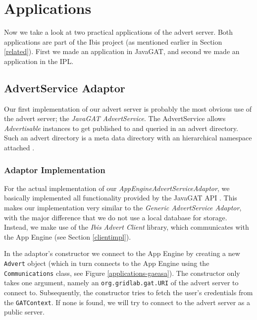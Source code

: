 \section{Applications}
\label{applications}
Now we take a look at two practical applications of the advert server. Both
applications are part of the Ibis project (as mentioned earlier in Section
\ref{related}). First we made an application in JavaGAT, and second we made an
application in the IPL.

\subsection{AdvertService Adaptor}
\label{applications-advertservice}
Our first implementation of our advert server is probably the most obvious use
of the advert server; the \emph{JavaGAT AdvertService}. The AdvertService
allows \emph{Advertisable} instances to get published to and queried in an
advert directory. Such an advert directory is a meta data directory with an
hierarchical namespace attached \cite{javagat-javadoc}.

\subsubsection{Adaptor Implementation}
For the actual implementation of our \emph{AppEngineAdvertServiceAdaptor}, we
basically implemented all functionality provided by the JavaGAT API
\cite{javagat-javadoc}. This makes our implementation very similar to the
\emph{Generic AdvertService Adaptor}, with the major difference that we do not
use a local database for storage. Instead, we make use of the \emph{Ibis Advert
Client} library, which communicates with the App Engine (see Section 
\ref{clientimpl}). 

In the adaptor's constructor we connect to the App Engine by creating a new
\texttt{Advert} object (which in turn connects to the App Engine using the
\texttt{Communications} class, see Figure \ref{applications-gaeasa}). The
constructor only takes one argument, namely an \texttt{org.gridlab.gat.URI} of
the advert server to connect to. Subsequently, the constructor tries to fetch the
user's credentials from the \texttt{GATContext}. If none is found, we will try to
connect to the advert server as a public server.

